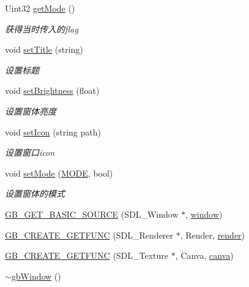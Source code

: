 \begin{DoxyCompactItemize}
Uint32 \mbox{\hyperlink{classgb_window_af86a84effc2ab72df5dfa881c5e6d620}{get\+Mode}} ()
\begin{DoxyCompactList}\small\item\em 获得当时传入的flag \end{DoxyCompactList}\item 
void \mbox{\hyperlink{classgb_window_a17f154d7c86e29d7337fe46cc183c5dc}{set\+Title}} (string)
\begin{DoxyCompactList}\small\item\em 设置标题 \end{DoxyCompactList}\item 
void \mbox{\hyperlink{classgb_window_aec17f885a0d2dcf1a6d281799542071a}{set\+Brightness}} (float)
\begin{DoxyCompactList}\small\item\em 设置窗体亮度 \end{DoxyCompactList}\item 
void \mbox{\hyperlink{classgb_window_a1a4802fa6b726f60f6dd61c7de2f8d73}{set\+Icon}} (string path)
\begin{DoxyCompactList}\small\item\em 设置窗口icon \end{DoxyCompactList}\item 
void \mbox{\hyperlink{classgb_window_abf2068b28248fb4f9ed5d39a5df58d0a}{set\+Mode}} (\mbox{\hyperlink{classgb_window_a19e70d277e17598ddb3c229e28dbb9e9}{M\+O\+DE}}, bool)
\begin{DoxyCompactList}\small\item\em 设置窗体的模式 \end{DoxyCompactList}\item 
\mbox{\hyperlink{classgb_window_a7a24cdcd80201982dca8944b073a76f9}{G\+B\+\_\+\+G\+E\+T\+\_\+\+B\+A\+S\+I\+C\+\_\+\+S\+O\+U\+R\+CE}} (S\+D\+L\+\_\+\+Window $\ast$, \mbox{\hyperlink{classgb_window_a1faf26696f9974e05cae77fb240a502e}{window}})
\item 
\mbox{\hyperlink{classgb_window_ae9cad58be7ed334b148502b1e0f6fbc7}{G\+B\+\_\+\+C\+R\+E\+A\+T\+E\+\_\+\+G\+E\+T\+F\+U\+NC}} (S\+D\+L\+\_\+\+Renderer $\ast$, Render, \mbox{\hyperlink{classgb_window_a8b83d44addf7721bb1c419dfdcd105ad}{render}})
\item 
\mbox{\hyperlink{classgb_window_a4dac120762629bb0a0731950f22a0835}{G\+B\+\_\+\+C\+R\+E\+A\+T\+E\+\_\+\+G\+E\+T\+F\+U\+NC}} (S\+D\+L\+\_\+\+Texture $\ast$, Canva, \mbox{\hyperlink{classgb_window_a03dded5e834b624a4e026b6c6e298606}{canva}})
\item 
\mbox{\hyperlink{classgb_window_acd0d49bdf1dbe7df86e02ba82a318571}{$\sim$gb\+Window}} ()
\end{DoxyCompactItemize}
